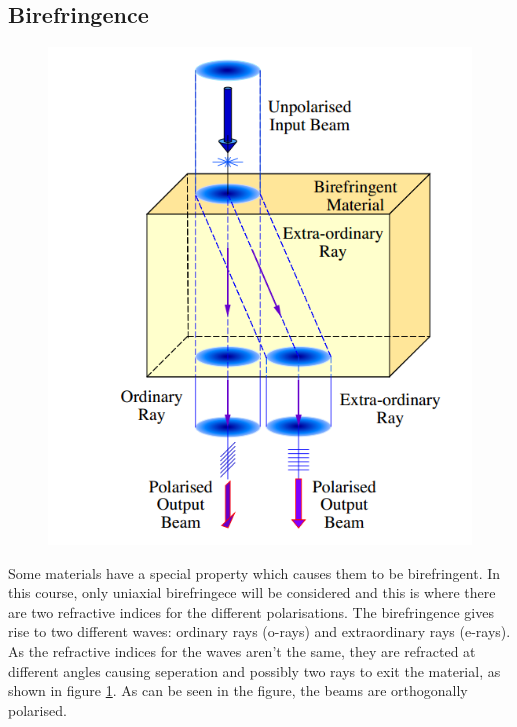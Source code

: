 \subsection{Birefringence}
\begin{minipage}{0.5\linewidth}
	\begin{figure} [H]
		\includegraphics[width=\linewidth,scale=0.7]{Photonics/birefr_eg}
		\label{fig:ItP:birefr_1}
	\end{figure}	
\end{minipage}
\begin{minipage}{0.5\linewidth}
	Some materials have a special property which causes them to be birefringent. 
	In this course, only uniaxial birefringece will be considered and this is where there are two refractive indices for the different polarisations. 
	The birefringence gives rise to two different waves: ordinary rays (o-rays) and extraordinary rays (e-rays).
	As the refractive indices for the waves aren't the same, they are refracted at different angles causing seperation and possibly two rays to exit the material, as shown in figure \ref{fig:ItP:birefr_1}.
	As can be seen in the figure, the beams are orthogonally polarised.
\end{minipage}
